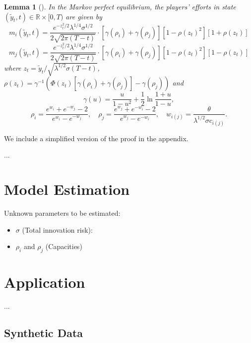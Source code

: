 \documentclass[a4paper, 11pt]{article}
\theoremstyle{plain} %
\newtheorem{lemma}{Lemma}
\begin{document}
\begin{lemma}[\citealt{ryvkin2022fight}]
In the Markov perfect equilibrium, the players’ efforts in state $(\tilde{y}_t, t) \in\mathbb{R}\times[0, T)$ are given by
\begin{equation*}
m_{i}(\tilde{y}_t, t) = \frac{e^{-z_t^2/2}\lambda^{1/4}\sigma^{1/2}}{2\sqrt{2\pi(T-t)}} \cdot \left[\gamma(\rho_{i}) + \gamma(\rho_{j})\right]\left[1-\rho(z_t)^2\right]\left[1 + \rho(z_t)\right]
\end{equation*}
\begin{equation*}
m_{j}(\tilde{y}_t, t) = \frac{e^{-z_t^2/2}\lambda^{1/4}\sigma^{1/2}}{2\sqrt{2\pi(T-t)}} \cdot 
 \left[\gamma(\rho_{i}) + \gamma(\rho_{j})\right]\left[1-\rho(z_t)^2\right]\left[1 - \rho(z_t)\right]
\end{equation*}
where $z_t = \tilde{y}_t / \sqrt{\lambda^{1/2}\sigma(T-t)}$, $\rho(z_t) = \gamma^{-1}\left(\Phi(z_t)\left[\gamma(\rho_{i})+\gamma(\rho_{j})\right]-\gamma(\rho_{j})\right)$ and 
\begin{equation*}
\gamma(u) = \frac{u}{1-u^2} + \frac{1}{2}\ln\frac{1+u}{1-u},
\end{equation*}
\begin{equation*}
\rho_{i} = \frac{e^{w_{i}}+e^{-w_{j}}-2}{e^{w_{i}}-e^{-w_{j}}},
\quad
\rho_{j} = \frac{e^{w_{j}}+e^{-w_{i}}-2}{e^{w_{j}}-e^{-w_{i}}},
\quad
w_{i(j)} = \frac{\theta}{\lambda^{1/2}\sigma c_{i(j)}}.
\end{equation*}
\end{lemma}

We include a simplified version of the proof in the appendix.

...


\section{Model Estimation}

Unknown parameters to be estimated: 
\begin{itemize}
	\item $\sigma$ (Total innovation risk): 
	\item $\rho_i$ and $\rho_j$ (Capacities)
\end{itemize}

\section{Application}

...

\subsection{Synthetic Data}
\end{document}
